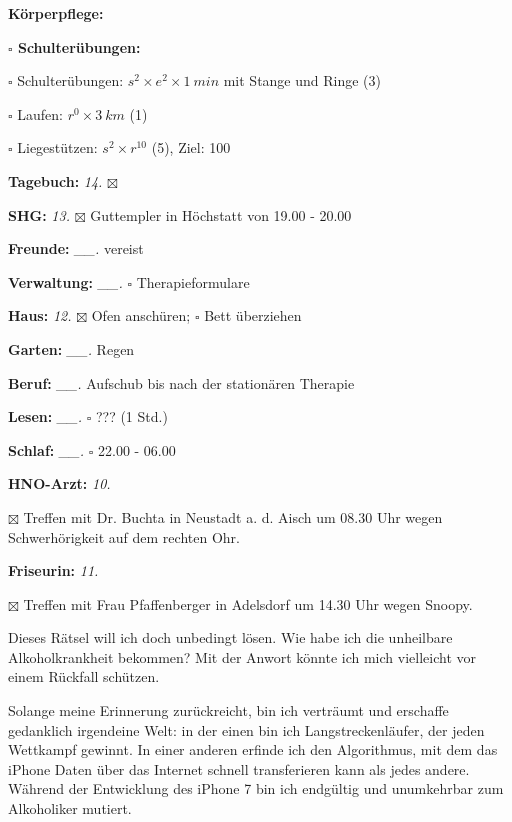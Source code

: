 \documentclass[10pt,a4paper]{article}
\newcommand\prop[1] {{\color {alizarin} {\bf #1}}}        %
\newcommand\opti[1] {{\color {amethyst} {\bf #1}}}        %
\newcommand\mand[1] {{\color {burntorange} {\bf #1}}}     %
\newcommand\topvskip {\vskip 8pt}
\newcommand\topspace{\vskip -15pt \hskip 20pt}
\newcommand\bottomspace{\vskip 4pt}
\newcommand\n[1] { {\sl #1.} \hskip 5pt }
\begin{document}
\begin{mdframed}[style=daystyle]
\begin{labeling}{{\mand {Körperpflege:}}}
\begin{minipage}{0.75\textwidth}
\begin{labeling}{\prop {$\square$ {Schulterübungen:}}}
      \item[$\square$ Schulterübungen:] $s^2 \times e^2 \times 1\ min$ mit Stange und Ringe (3)
      \item[$\square$ Laufen:]          $r^0 \times 3\ km$ (1)
      \item[$\square$ Liegestützen:]    $s^2 \times r^{10}$ (5), Ziel: 100
      \end{labeling}
    \end{minipage}
    \bottomspace    
  \item[{\mand {Tagebuch:}}]       \n{14} $\boxtimes$
  \item[{\mand {SHG:}}]            \n{13} $\boxtimes$ Guttempler in Höchstatt von 19.00 - 20.00
  \item[{\mand {Freunde:}}]      \n{\_\_} vereist
  \item[{\mand {Verwaltung:}}]   \n{\_\_} $\square$ Therapieformulare
  \item[{\mand {Haus:}}]           \n{12} $\boxtimes$ Ofen anschüren; $\square$ Bett überziehen
  \item[{\mand {Garten:}}]       \n{\_\_} Regen
  \item[{\mand {Beruf:}}]        \n{\_\_} Aufschub bis nach der stationären Therapie
  \item[{\mand {Lesen:}}]        \n{\_\_} $\square$ ??? (1 Std.)
  \item[{\mand {Schlaf:}}]       \n{\_\_} $\square$ 22.00 - 06.00
  \item[{\opti {HNO-Arzt:}}]       \n{10} 
    \topspace
    \begin{minipage}{0.75\textwidth}
      $\boxtimes$ Treffen mit Dr. Buchta in Neustadt a. d. Aisch um 08.30 Uhr
      wegen Schwerhörigkeit auf dem rechten Ohr.
    \end{minipage}
    \bottomspace
  \item[{\opti {Friseurin:}}]      \n{11} 
    \topspace
    \begin{minipage}{0.75\textwidth}
      $\boxtimes$ Treffen mit Frau Pfaffenberger in Adelsdorf um 14.30 Uhr wegen Snoopy.
    \end{minipage}
    \bottomspace
  \end{labeling}

  \topvskip
Dieses Rätsel will ich doch unbedingt lösen. Wie habe ich die unheilbare
Alkoholkrankheit bekommen? Mit der Anwort könnte ich mich vielleicht vor einem
Rückfall schützen.

\vskip 4pt
Solange meine Erinnerung zurückreicht, bin ich verträumt und erschaffe
gedanklich irgendeine Welt: in der einen bin ich Langstreckenläufer, der jeden
Wettkampf gewinnt. In einer anderen erfinde ich den Algorithmus, mit dem das
iPhone Daten über das Internet schnell transferieren kann als jedes andere.
Während der Entwicklung des iPhone 7 bin ich endgültig und unumkehrbar zum
Alkoholiker mutiert.


\end{mdframed}
\end{document}
